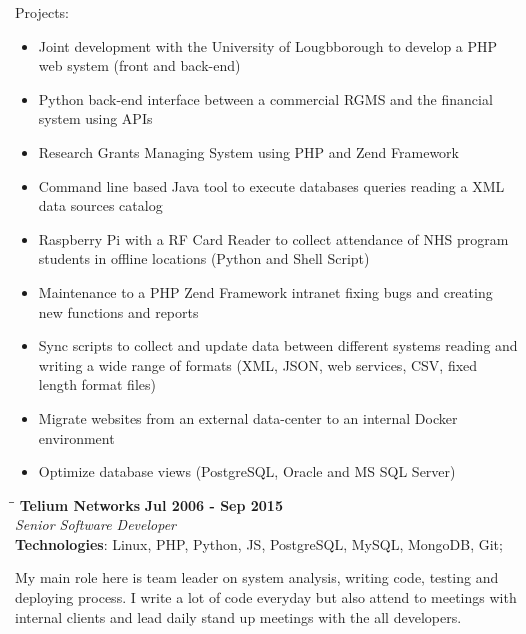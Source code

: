 \documentclass[margin]{res}
\begin{document}
\begin{resume}
    Projects:
    \begin{itemize}
      \item Joint development with the University of Lougbborough to develop a PHP web system (front and back-end)
      \item Python back-end interface between a commercial RGMS and the financial system using APIs
      \item Research Grants Managing System using PHP and Zend Framework
      \item Command line based Java tool to execute databases queries reading a XML data sources catalog
      \item Raspberry Pi with a RF Card Reader to collect attendance of NHS program students in offline locations (Python and Shell Script)
      \item Maintenance to a PHP Zend Framework intranet fixing bugs and creating new functions and reports
      \item Sync scripts to collect and update data between different systems reading and writing a wide range of formats (XML, JSON, web services, CSV, fixed length format files)
      \item Migrate websites from an external data-center to an internal Docker environment
      \item Optimize database views (PostgreSQL, Oracle and MS SQL Server)
    \end{itemize}

\vspace{5.0in}



\vspace{-0.1in}
   \begin{tabbing}
   \hspace{2.3in}\= \hspace{1.7in}\= \kill %
    \textbf{Telium Networks}    \>\>\textbf{Jul 2006 - Sep 2015}\\
    \textit{Senior Software Developer}\\        
    \textbf{Technologies}: Linux, PHP, Python, JS, PostgreSQL, MySQL, MongoDB, Git;
   \end{tabbing}\vspace{-20pt}      %
    \vspace{2mm}
    My main role here is team leader on system analysis, writing code, testing and deploying process. I write a lot of code everyday but also attend to meetings with internal clients and lead daily stand up meetings with the all developers.


\end{resume}
\end{document}
